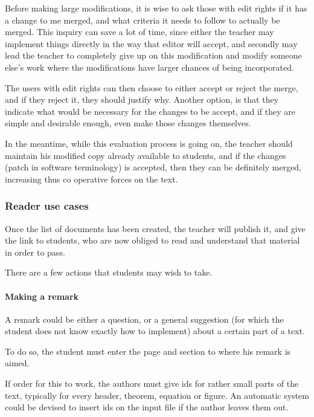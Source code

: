 \documentclass[12pt]{article}
\begin{document}
Before making large modifications, it is wise to ask those with edit rights if it has a change to me merged, and what criteria it needs to follow to actually be merged. This inquiry can save a lot of time, since either the teacher may implement things directly in the way that editor will accept, and secondly may lead the teacher to completely give up on this modification and modify someone else's work where the modifications have larger chances of being incorporated.

The users with edit rights can then choose to either accept or reject the merge, and if they reject it, they should justify why. Another option, is that they indicate what would be necessary for the changes to be accept, and if they are simple and desirable enough, even make those changes themselves.

In the meantime, while this evaluation process is going on, the teacher should maintain his modified copy already available to students, and if the changes (patch in software terminology) is accepted, then they can be definitely merged, increasing thus co operative forces on the text.

\subsubsection{Reader use cases} \label{reader-use-cases}

Once the list of documents has been created, the teacher will publish it, and give the link to students, who are now obliged to read and understand that material in order to pass.

There are a few actions that students may wish to take.

\paragraph{Making a remark} \label{make-a-remark}

A remark could be either a question, or a general suggestion (for which the student does not know exactly how to implement) about a certain part of a text.  
  
To do so, the student must enter the page and section to where his remark is aimed.
  
If order for this to work, the authors must give ids for rather small parts of the text, typically for every header, theorem, equation or figure. An automatic system could be devised to insert ids on the input file if the author leaves them out.
  
\end{document}
